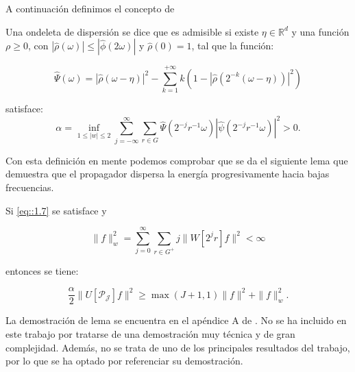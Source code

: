 \noindent A continuación definimos el concepto de 
\begin{definicion}
  Una ondeleta de dispersión se dice que es admisible si existe $\eta \in \mathbb{R}^d$ y una función $\rho \geq 0$, con $|\widehat{\rho}(\omega)| \leq |\widehat{\phi}(2\omega)|$ y $\widehat{\rho}(0)=1$, tal que la función: 

\begin{equation}\label{eq::1.6}
  \widehat{\Psi}(\omega)=|\widehat{\rho}(\omega - \eta)|^2 - \sum_{k=1}^{+\infty} k(1-|\widehat{\rho}(2^{-k}(\omega - \eta))|^2)
\end{equation}
  
\noindent satisface: 
\begin{equation} \label{eq::1.7}
  \alpha= \inf_{1\leq|w|\leq2} \sum_{j=-\infty}^{\infty} \sum_{r\in G} \widehat{\Psi} (2^{-j}r^{-1}\omega)|\widehat{\psi}(2^{-j}r^{-1}\omega)|^2>0.
\end{equation}

\end{definicion}

\noindent Con esta definición en mente podemos comprobar que se da el siguiente lema que demuestra que el propagador dispersa la energía progresivamente hacia bajas frecuencias.

\begin{lema} \label{lema::Admisibilidad}
Si \eqref{eq::1.7} se satisface y 

\begin{equation}
  \|f\|_w^2=\sum_{j=0}^\infty \sum_{r\in G^+} j \|W[2^j r] f\|^2 < \infty
\end{equation}

\noindent entonces se tiene: 

\begin{equation}\label{eq::1.9}
  \frac{\alpha}{2}\|U[\mathcal{P_J}]f\|^2 \geq \max (J+1,1) \|f\|^2 + \|f\|_w^2.
\end{equation}

\end{lema}

\medskip

\noindent La demostración de lema se encuentra en el apéndice A de \cite{GroupInvariantScattering}. No se ha incluido en este trabajo por tratarse de una demostración muy técnica y de gran complejidad. Además, no se trata de uno de los principales resultados del trabajo, por lo que se ha optado por referenciar su demostración.

\medskip

